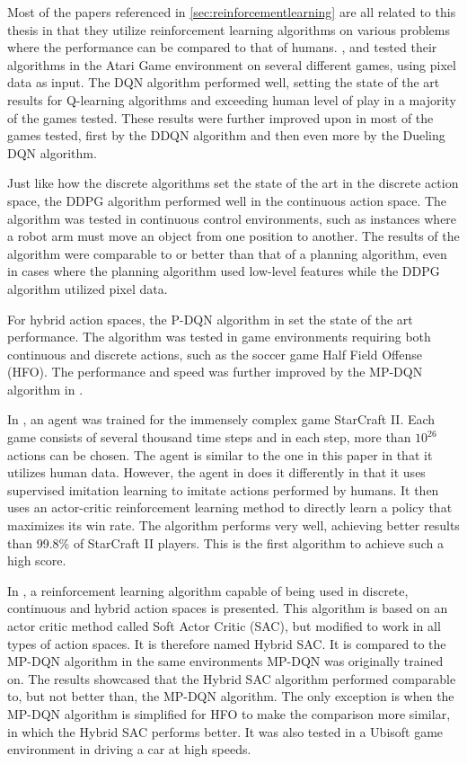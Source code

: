 \documentclass{kththesis}
\begin{document}
Most of the papers referenced in \autoref{sec:reinforcementlearning} are all related to this thesis in that they utilize reinforcement learning algorithms on various problems where the performance can be compared to that of humans. \textcite{mnih2015human}, \textcite{van2016deep} and \textcite{wang2015dueling} tested their algorithms in the Atari Game environment on several different games, using pixel data as input. The DQN algorithm performed well, setting the state of the art results for Q-learning algorithms and exceeding human level of play in a majority of the games tested. These results were further improved upon in most of the games tested, first by the DDQN algorithm and then even more by the Dueling DQN algorithm. 

Just like how the discrete algorithms set the state of the art in the discrete action space, the DDPG algorithm performed well in the continuous action space. The algorithm was tested in continuous control environments, such as instances where a robot arm must move an object from one position to another. The results of the algorithm were comparable to or better than that of a planning algorithm, even in cases where the planning algorithm used low-level features while the DDPG algorithm utilized pixel data. \parencite{lillicrap2015continuous}

For hybrid action spaces, the P-DQN algorithm in \textcite{xiong2018parametrized} set the state of the art performance. The algorithm was tested in game environments requiring both continuous and discrete actions, such as the soccer game Half Field Offense (HFO). The performance and speed was further improved by the MP-DQN algorithm in \textcite{bester2019mpdqn}.

In \textcite{vinyals2019grandmaster}, an agent was trained for the immensely complex game StarCraft II. Each game consists of several thousand time steps and in each step, more than $10^{26}$ actions can be chosen. The agent is similar to the one in this paper in that it utilizes human data. However, the agent in \textcite{vinyals2019grandmaster} does it differently in that it uses supervised imitation learning to imitate actions performed by humans. It then uses an actor-critic reinforcement learning method to directly learn a policy that maximizes its win rate. The algorithm performs very well, achieving better results than 99.8\% of StarCraft II players. This is the first algorithm to achieve such a high score.

In \textcite{delalleau2019discrete}, a reinforcement learning algorithm capable of being used in discrete, continuous and hybrid action spaces is presented. This algorithm is based on an actor critic method called Soft Actor Critic (SAC), but modified to work in all types of action spaces. It is therefore named Hybrid SAC. It is compared to the MP-DQN algorithm in the same environments MP-DQN was originally trained on. The results showcased that the Hybrid SAC algorithm performed comparable to, but not better than, the MP-DQN algorithm. The only exception is when the MP-DQN algorithm is simplified for HFO to make the comparison more similar, in which the Hybrid SAC performs better. It was also tested in a Ubisoft game environment in driving a car at high speeds.
\end{document}
